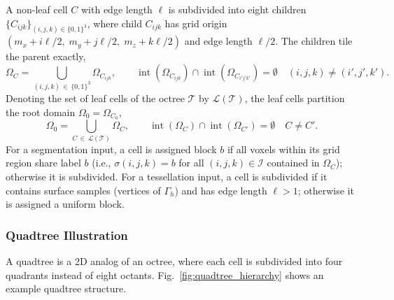 \documentclass[review,12pt]{elsarticle}
\begin{document}
A non-leaf cell $C$ with edge length $\ell$ is subdivided into eight children $\{C_{ijk}\}_{(i,j,k)\in\{0,1\}^3}$, where child $C_{ijk}$ has grid origin $(m_x + i\ell/2,\; m_y + j\ell/2,\; m_z + k\ell/2)$ and edge length $\ell/2$. The children tile the parent exactly,
\begin{equation}
  \Omega_C = \bigcup_{(i,j,k)\,\in\,\{0,1\}^3} \Omega_{C_{ijk}},
  \qquad
  \operatorname{int}(\Omega_{C_{ijk}}) \cap \operatorname{int}(\Omega_{C_{i'j'k'}}) = \emptyset
  \quad (i,j,k) \neq (i',j',k').
\end{equation}
Denoting the set of leaf cells of the octree $\mathcal{T}$ by $\mathcal{L}(\mathcal{T})$, the leaf cells partition the root domain $\Omega_0 = \Omega_{C_0}$,
\begin{equation}
  \Omega_0 = \bigcup_{C\,\in\,\mathcal{L}(\mathcal{T})} \Omega_C,
  \qquad
  \operatorname{int}(\Omega_C) \cap \operatorname{int}(\Omega_{C'}) = \emptyset
  \quad C \neq C'.
\end{equation}
For a segmentation input, a cell is assigned block $b$ if all voxels within its grid region share label $b$ (i.e., $\sigma(i,j,k) = b$ for all $(i,j,k) \in \mathcal{I}$ contained in $\Omega_C$); otherwise it is subdivided. For a tessellation input, a cell is subdivided if it contains surface samples (vertices of $\Gamma_h$) and has edge length $\ell > 1$; otherwise it is assigned a uniform block.

\subsubsection{Quadtree Illustration}

A quadtree is a 2D analog of an octree, where each cell is subdivided into four quadrants instead of eight octants. Fig.~\ref{fig:quadtree_hierarchy} shows an example quadtree structure.
\end{document}
